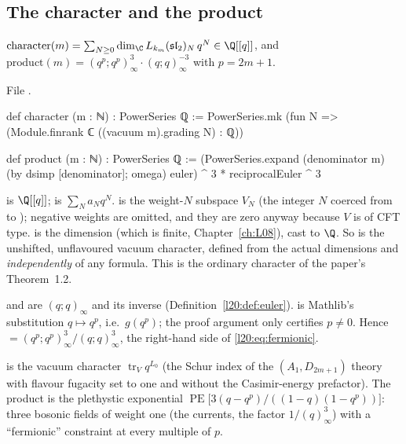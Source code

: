 \subsection{The character and the product}

\begin{definition}\label{l20:def:character}
$\mathrm{character}(m)=\sum_{N\ge0}\dim_\C L_{k_m}(\ltwentysl)_N\,q^N\in\Q[[q]]$, and
$\mathrm{product}(m)=(q^p;q^p)_\infty^3\cdot(q;q)_\infty^{-3}$ with $p=2m+1$.
\end{definition}
\noindent File .
\begin{leancode}
def character (m : ℕ) : PowerSeries ℚ :=
  PowerSeries.mk (fun N => (Module.finrank ℂ ((vacuum m).grading N) : ℚ))

def product (m : ℕ) : PowerSeries ℚ :=
  (PowerSeries.expand (denominator m) (by dsimp [denominator]; omega) euler) ^ 3 *
    reciprocalEuler ^ 3
\end{leancode}

\begin{dictionary}
 is $\Q[[q]]$;  is $\sum_Na_Nq^N$.  is
the weight-$N$ subspace $V_N$ (the integer $N$ coerced from  to ); negative weights are
omitted, and they are zero anyway because $V$ is of CFT type.  is the dimension (which
is finite, Chapter~\ref{ch:L08}), cast to $\Q$. So  is the unshifted, unflavoured vacuum
character, defined from the actual dimensions and \emph{independently} of any formula. This is the
ordinary character of the paper's Theorem~1.2.

 and  are $(q;q)_\infty$ and its inverse (Definition~\ref{l20:def:euler}).
 is Mathlib's substitution $q\mapsto q^p$, i.e.\ $g(q^p)$; the proof
argument  only certifies $p\neq0$. Hence
 $=(q^p;q^p)^3_\infty/(q;q)^3_\infty$, the right-hand side of \eqref{l20:eq:fermionic}.
\end{dictionary}

\begin{physics}
 is the vacuum character $\operatorname{tr}_Vq^{L_0}$ (the Schur index of the
$(A_1,D_{2m+1})$ theory with flavour fugacity set to one and without the Casimir-energy prefactor). The
product is the plethystic exponential $\operatorname{PE}\bigl[3(q-q^p)/((1-q)(1-q^p))\bigr]$: three bosonic
fields of weight one (the currents, the factor $1/(q)^3_\infty$) with a ``fermionic'' constraint at every
multiple of $p$.
\end{physics}

